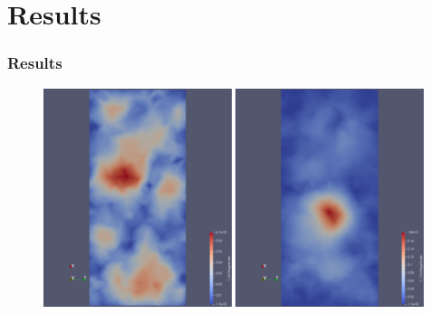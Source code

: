 \documentclass[
  pdf,
  10pt,
  xcolor={svgnames},
]{beamer}
\begin{document}
\section{Results}
\begin{frame}
  \frametitle{Results}
  \begin{figure}
    \centering
    \includegraphics[width=0.49\textwidth]{./resources/prior_sample}
    \includegraphics[width=0.49\textwidth]{./resources/posterior_sample}
  \end{figure}
\end{frame}
\end{document}
